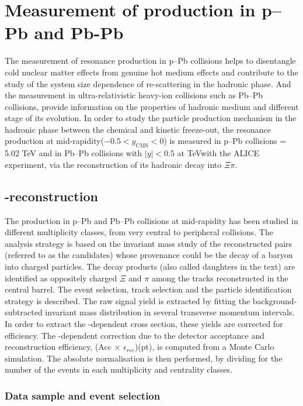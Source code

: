 \section{Measurement of \xis production in p--Pb and Pb-Pb}\label{sec:pPbPbPb}
The measurement of resonance production in p--Pb collisions helps to disentangle cold nuclear matter effects from genuine hot medium effects and contribute to the study of the system size dependence of re-scattering in the hadronic phase. And the measurement in ultra-relativistic heavy-ion collisions such as Pb--Pb collisions, provide information on the properties of hadronic medium and different stage of its evolution. 
In order to study the particle production mechanism in the hadronic phase between the chemical and kinetic freeze-out, the \xis resonance production at mid-rapidity($-0.5<y_{\mathrm{CMS}}<0$) is measured in p--Pb collisions \snn = 5.02  TeV and in Pb--Pb collisions with $|y|<$0.5 at  TeVwith the ALICE experiment, via the reconstruction of its hadronic decay into $\Xi\pi$.

\subsection{\xis-reconstruction}\label{sec:Reconstruction}
The \xiss production in p--Pb and Pb--Pb collisions at mid-rapidity has been studied in different multiplicity classes, from very central to peripheral collisions. The analysis strategy is based on the invariant mass study of the reconstructed pairs (referred to as the candidates) whose provenance could be the decay of a \xiss baryon into charged particles. The decay products (also called daughters in the text) are identified as oppositely charged $\Xi$ and $\pi$ among the tracks reconstructed in the central barrel. The event selection, track selection and the particle identification strategy is described. The raw signal yield is extracted by fitting the background-subtracted invariant mass distribution in several transverse momentum intervals. In order to extract the \pt-dependent cross section, these yields are corrected for efficiency. The \pt-dependent correction due to the detector acceptance and reconstruction efficiency, (Acc $\times$ $\epsilon_{rec}$)(pt), is computed from a Monte Carlo simulation. The absolute normalisation is then performed, by dividing for the number of the events in each multiplicity and centrality classes.


\subsubsection{Data sample and event selection}\label{sec:Selection}


